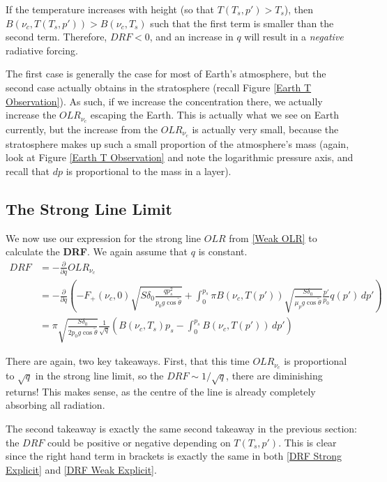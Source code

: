 If the temperature increases with height (so that $T(T_s,p')>T_s$), then $B(\nu_c,T(T_s,p'))>B(\nu_c,T_s)$ such that the first term is smaller than the second term. Therefore, $DRF<0$, and an increase in $q$ will result in a \textit{negative} radiative forcing.

The first case is generally the case for most of Earth's atmosphere, but the second case actually obtains in the stratosphere (recall Figure \ref{Earth T Observation}). As such, if we increase the concentration there, we actually increase the $OLR_{\nu_c}$ escaping the Earth. This is actually what we see on Earth currently, but the increase from the $OLR_{\nu_c}$ is actually very small, because the stratosphere makes up such a small proportion of the atmosphere's mass (again, look at Figure \ref{Earth T Observation} and note the logarithmic pressure axis, and recall that $dp$ is proportional to the mass in a layer).

\subsection{The Strong Line Limit}

We now use our expression for the strong line $OLR$ from \ref{Weak OLR} to calculate the \textbf{DRF}. We again assume that $q$ is constant.
\begin{align}
    DRF &= -\frac{\partial}{\partial q}OLR_{\nu_c}\nonumber\\
    &=-\frac{\partial}{\partial q} \left( 
        -F_+(\nu_c,0)\sqrt{S\delta_0 \frac{qp_s^2}{p_0g\cos\tilde{\theta}}}+\int_{0}^{p_s}\pi B(\nu_c,T(p'))\sqrt{\frac{S\delta_0}{\mu_pg\cos\tilde{\theta}}}\frac{p'}{p_0}q(p')\,dp'
     \right)\nonumber\\
    \label{DRF Strong Explicit}
    &= \pi\sqrt{\frac{S\delta_0}{2p_0g\cos\tilde{\theta}}}\frac{1}{\sqrt{q}}\left( 
        B(\nu_c,T_s)p_s-\int_{0}^{p_s}B(\nu_c,T(p'))\,dp'
     \right)
\end{align}

There are again, two key takeaways. First, that this time $OLR_{\nu_c}$ is proportional to $\sqrt{q}$ in the strong line limit, so the $DRF\sim 1/\sqrt{q}$, there are diminishing returns! This makes sense, as the centre of the line is already completely absorbing all radiation. 

The second takeaway is exactly the same second takeaway in the previous section: the $DRF$ could be positive or negative depending on $T(T_s,p')$. This is clear since the right hand term in brackets is exactly the same in both \ref{DRF Strong Explicit} and \ref{DRF Weak Explicit}.

